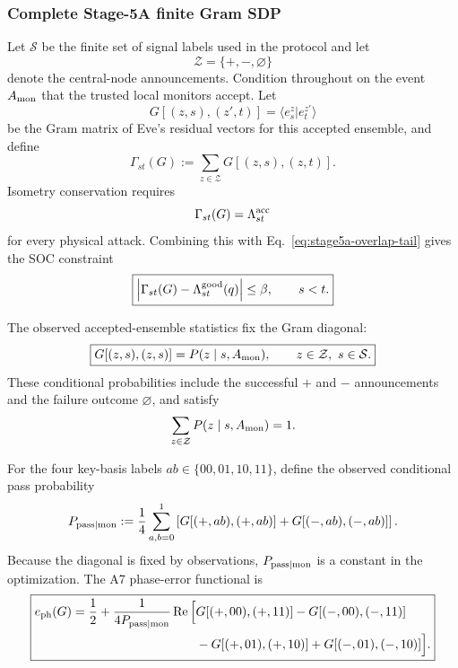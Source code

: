 \documentclass[11pt]{article}
\theoremstyle{remark}
\begin{document}
\subsubsection{Complete Stage-5A finite Gram SDP}

Let \(\mathcal S\) be the finite set of signal labels used in the protocol and
let
\[
    \mathcal Z=\{+,-,\varnothing\}
\]
denote the central-node announcements.  Condition throughout on the event
\(A_{\rm mon}\) that the trusted local monitors accept.  Let
\[
    G[(z,s),(z',t)]
    =
    \langle e_s^z|e_t^{z'}\rangle
\]
be the Gram matrix of Eve's residual vectors for this accepted ensemble, and
define
\begin{equation}
    \Gamma_{st}(G)
    :=
    \sum_{z\in\mathcal Z}
    G[(z,s),(z,t)].
    \label{eq:stage5a-Gamma}
\end{equation}
Isometry conservation requires
\[
    \Gamma_{st}(G)
    =
    \Lambda_{st}^{\rm acc}
\]
for every physical attack.  Combining this with
Eq.~\eqref{eq:stage5a-overlap-tail} gives the SOC constraint
\begin{equation}
    \boxed{
    \left|
      \Gamma_{st}(G)
      -
      \Lambda_{st}^{\rm good}(q)
    \right|
    \le
    \beta,
    \qquad
    s<t.
    }
    \label{eq:stage5a-gram-soc}
\end{equation}

The observed accepted-ensemble statistics fix the Gram diagonal:
\begin{equation}
    \boxed{
    G[(z,s),(z,s)]
    =
    P(z\mid s,A_{\rm mon}),
    \qquad
    z\in\mathcal Z,\ s\in\mathcal S.
    }
    \label{eq:stage5a-observed-diagonal}
\end{equation}
These conditional probabilities include the successful \(+\) and \(-\)
announcements and the failure outcome \(\varnothing\), and satisfy
\[
    \sum_{z\in\mathcal Z}
    P(z\mid s,A_{\rm mon})=1.
\]

For the four key-basis labels \(ab\in\{00,01,10,11\}\), define the observed
conditional pass probability
\begin{equation}
    P_{\rm pass|mon}
    :=
    \frac14
    \sum_{a,b=0}^1
    \left[
      G[(+,ab),(+,ab)]
      +
      G[(-,ab),(-,ab)]
    \right].
    \label{eq:stage5a-ppass}
\end{equation}
Because the diagonal is fixed by observations, \(P_{\rm pass|mon}\) is a
constant in the optimization.  The A7 phase-error functional is
\begin{equation}
\boxed{
\begin{aligned}
    e_{\rm ph}(G)
    =
    \frac12
    +
    \frac{1}{4P_{\rm pass|mon}}
    \operatorname{Re}\Big[
      &G[(+,00),(+,11)]
      -
      G[(-,00),(-,11)]
      \\
      &-
      G[(+,01),(+,10)]
      +
      G[(-,01),(-,10)]
    \Big].
\end{aligned}
}
\label{eq:stage5a-eph}
\end{equation}
\end{document}
